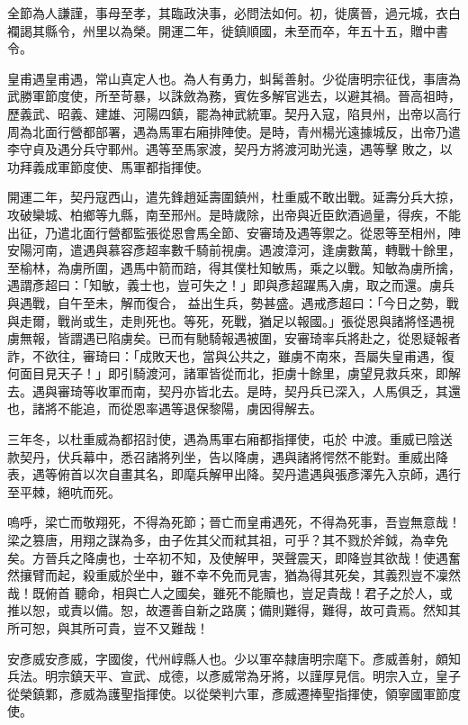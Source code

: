 \begin{pinyinscope}
 全節為人謙謹，事母至孝，其臨政決事，必問法如何。初，徙廣晉，過元城，衣白襴謁其縣令，州里以為榮。開運二年，徙鎮順國，未至而卒，年五十五，贈中書令。



 皇甫遇皇甫遇，常山真定人也。為人有勇力，虯髯善射。少從唐明宗征伐，事唐為武勝軍節度使，所至苛暴，以誅斂為務，賓佐多解官逃去，以避其禍。晉高祖時，歷義武、昭義、建雄、河陽四鎮，罷為神武統軍。契丹入寇，陷貝州，出帝以高行周為北面行營都部署，遇為馬軍右廂排陣使。是時，青州楊光遠據城反，出帝乃遣李守貞及遇分兵守鄆州。遇等至馬家渡，契丹方將渡河助光遠，遇等擊
 敗之，以功拜義成軍節度使、馬軍都指揮使。



 開運二年，契丹寇西山，遣先鋒趙延壽圍鎮州，杜重威不敢出戰。延壽分兵大掠，攻破欒城、柏鄉等九縣，南至邢州。是時歲除，出帝與近臣飲酒過量，得疾，不能出征，乃遣北面行營都監張從恩會馬全節、安審琦及遇等禦之。從恩等至相州，陣安陽河南，遣遇與慕容彥超率數千騎前視虜。遇渡漳河，逢虜數萬，轉戰十餘里，至榆林，為虜所圍，遇馬中箭而踣，得其僕杜知敏馬，乘之以戰。知敏為虜所擒，遇謂彥超曰：「知敏，義士也，豈可失之！」即與彥超躍馬入虜，取之而還。虜兵與遇戰，自午至未，解而復合，
 益出生兵，勢甚盛。遇戒彥超曰：「今日之勢，戰與走爾，戰尚或生，走則死也。等死，死戰，猶足以報國。」張從恩與諸將怪遇視虜無報，皆謂遇已陷虜矣。已而有馳騎報遇被圍，安審琦率兵將赴之，從恩疑報者詐，不欲往，審琦曰：「成敗天也，當與公共之，雖虜不南來，吾屬失皇甫遇，復何面目見天子！」即引騎渡河，諸軍皆從而北，拒虜十餘里，虜望見救兵來，即解去。遇與審琦等收軍而南，契丹亦皆北去。是時，契丹兵已深入，人馬俱乏，其還也，諸將不能追，而從恩率遇等退保黎陽，虜因得解去。



 三年冬，以杜重威為都招討使，遇為馬軍右廂都指揮使，屯於
 中渡。重威已陰送款契丹，伏兵幕中，悉召諸將列坐，告以降虜，遇與諸將愕然不能對。重威出降表，遇等俯首以次自畫其名，即麾兵解甲出降。契丹遣遇與張彥澤先入京師，遇行至平棘，絕吭而死。



 嗚呼，梁亡而敬翔死，不得為死節；晉亡而皇甫遇死，不得為死事，吾豈無意哉！梁之篡唐，用翔之謀為多，由子佐其父而弒其祖，可乎？其不戮於斧鉞，為幸免矣。方晉兵之降虜也，士卒初不知，及使解甲，哭聲震天，即降豈其欲哉！使遇奮然攘臂而起，殺重威於坐中，雖不幸不免而見害，猶為得其死矣，其義烈豈不凜然哉！既俯首
 聽命，相與亡人之國矣，雖死不能贖也，豈足貴哉！君子之於人，或推以恕，或責以備。恕，故遷善自新之路廣；備則難得，難得，故可貴焉。然知其所可恕，與其所可貴，豈不又難哉！



 安彥威安彥威，字國俊，代州崞縣人也。少以軍卒隸唐明宗麾下。彥威善射，頗知兵法。明宗鎮天平、宣武、成德，以彥威常為牙將，以謹厚見信。明宗入立，皇子從榮鎮鄴，彥威為護聖指揮使。以從榮判六軍，彥威遷捧聖指揮使，領寧國軍節度使。




\end{pinyinscope}
